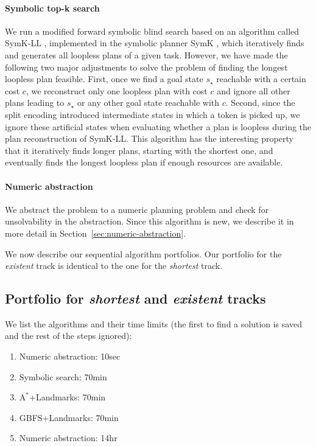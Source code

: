 \documentclass{article}
\newcommand{\astar}{\ensuremath{\text{A}^*}}
\renewcommand{\cite}[1]{\citep{#1}}
\begin{document}
\paragraph{Symbolic top-k search}
We run a modified forward symbolic blind search based on an algorithm 
called SymK-LL \cite{vontschammer-et-al-icaps2022}, implemented in the symbolic 
planner SymK \cite{speck-et-al-aaai2020}, which iteratively finds and generates 
all loopless plans of a given task.
However, we have made the following two major adjustments to solve the problem 
of finding the longest loopless plan feasible. 
First, once we find a goal state $s_{\star}$ reachable with a certain cost $c$, 
we reconstruct only one loopless plan with cost $c$ and ignore all other plans 
leading to $s_{\star}$ or any other goal state reachable with $c$. 
Second, since the split encoding introduced intermediate states in which a token 
is picked up, we ignore these artificial states when evaluating whether a plan 
is loopless during the plan reconstruction of SymK-LL.
This algorithm has the interesting property that it iteratively finds longer 
plans, starting with the shortest one, and eventually finds the longest loopless 
plan if enough resources are available.

\paragraph{Numeric abstraction} We abstract the problem to a numeric planning problem
and check for unsolvability in the abstraction. Since this algorithm is new, we describe
it in more detail in Section~\ref{sec:numeric-abstraction}.

We now describe our sequential algorithm portfolios. Our portfolio for the
\emph{existent} track is identical to the one for the \emph{shortest} track.

\subsection{Portfolio for \emph{shortest} and \emph{existent} tracks}

We list the algorithms and their time limits (the first to find a solution is saved and the rest of the steps ignored):

\begin{enumerate}
\item Numeric abstraction: 10sec
\item Symbolic search: 70min
\item $\astar$+Landmarks: 70min
\item GBFS+Landmarks: 70min
\item Numeric abstraction: 14hr
\end{enumerate}
\end{document}
